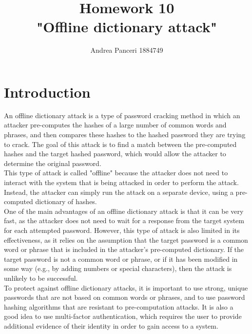 \documentclass{article}
\title{Homework 10\\"Offline dictionary attack"}
\author{Andrea Panceri 1884749}
\begin{document}
\maketitle

\section{Introduction}
An offline dictionary attack is a type of password cracking method in which an attacker pre-computes the hashes of a large number of common words and phrases, and then compares these hashes to the hashed password they are trying to crack. The goal of this attack is to find a match between the pre-computed hashes and the target hashed password, which would allow the attacker to determine the original password.\\
This type of attack is called "offline" because the attacker does not need to interact with the system that is being attacked in order to perform the attack. Instead, the attacker can simply run the attack on a separate device, using a pre-computed dictionary of hashes.\\
One of the main advantages of an offline dictionary attack is that it can be very fast, as the attacker does not need to wait for a response from the target system for each attempted password. However, this type of attack is also limited in its effectiveness, as it relies on the assumption that the target password is a common word or phrase that is included in the attacker's pre-computed dictionary. If the target password is not a common word or phrase, or if it has been modified in some way (e.g., by adding numbers or special characters), then the attack is unlikely to be successful.\\
To protect against offline dictionary attacks, it is important to use strong, unique passwords that are not based on common words or phrases, and to use password hashing algorithms that are resistant to pre-computation attacks. It is also a good idea to use multi-factor authentication, which requires the user to provide additional evidence of their identity in order to gain access to a system.\\
\end{document}
